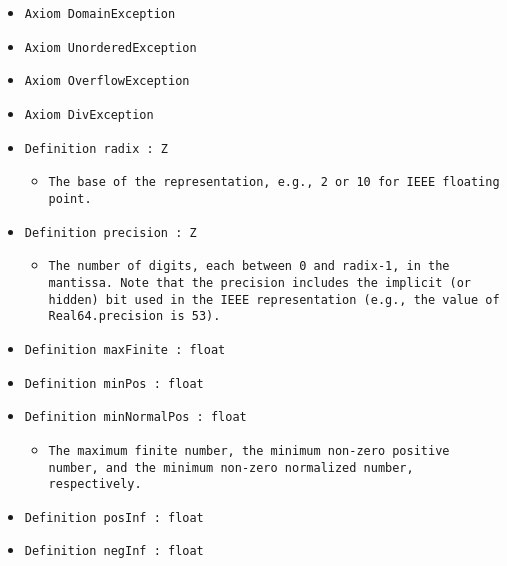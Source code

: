 \documentclass[11pt]{report}
\begin{document}
\begin{itemize}
\item  \texttt{Axiom DomainException}

\item  \texttt{Axiom UnorderedException}

\item  \texttt{Axiom OverflowException}

\item  \texttt{Axiom DivException}

\item  \texttt{Definition radix : Z}

\begin{itemize}
\item  \texttt{The base of the representation, e.g., 2 or 10 for IEEE floating point.}
\end{itemize}

\item  \texttt{Definition precision : Z}

\begin{itemize}
\item  \begin{flushleft} \texttt{The number of digits, each between 0 and radix-1, in the mantissa. Note that the precision includes the implicit (or hidden) bit used in the IEEE representation (e.g., the value of Real64.precision is 53).} \end{flushleft}
\end{itemize}

\item  \texttt{Definition maxFinite : float}

\item  \texttt{Definition minPos : float}

\item  \texttt{Definition minNormalPos : float}

\begin{itemize}
\item  \begin{flushleft} \texttt{The maximum finite number, the minimum non-zero positive number, and the minimum non-zero normalized number, respectively.} \end{flushleft}
\end{itemize}

\item  \texttt{Definition posInf : float}

\item  \texttt{Definition negInf : float}


\end{itemize}
\end{document}
